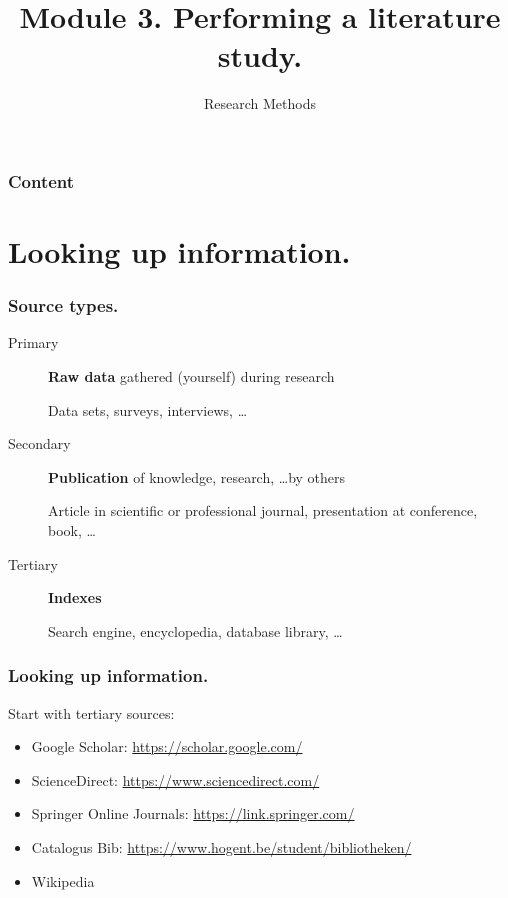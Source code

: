 \documentclass[aspectratio=169]{beamer}
\title{Module 3. Performing a literature study.}
\subtitle{Research Methods}
\author{\lecturers}   %
\date{\academicyear}
\begin{document}
    
    \begin{frame}
        \maketitle
    \end{frame}
    
    \begin{frame}
        \frametitle{Content}
        
        \tableofcontents
    \end{frame}
    
    \section{Looking up information.}
    
    \begin{frame}
        \frametitle{Source types.}
        
        \begin{description}
            \item[Primary] \textbf{Raw data} gathered (yourself) during research 
            
            Data sets, surveys, interviews, \ldots
            
            \item[Secondary] \textbf{Publication} of knowledge, research, \ldots by others
            
            Article in scientific or professional journal, presentation at conference, book, \ldots
            
            \item[Tertiary] \textbf{Indexes}
            
            Search engine, encyclopedia, database library, \ldots
            
        \end{description}
        
    \end{frame}
    
    \begin{frame}
        \frametitle{Looking up information.}
        
        Start with \alert{tertiary} sources:
        
        \begin{itemize}
            \item Google Scholar: \url{https://scholar.google.com/}
            \item ScienceDirect: \url{https://www.sciencedirect.com/}
            \item Springer Online Journals: \url{https://link.springer.com/}
            \item Catalogus Bib: \url{https://www.hogent.be/student/bibliotheken/}
            \item Wikipedia
        \end{itemize}
    \end{frame}
    
\end{document}
